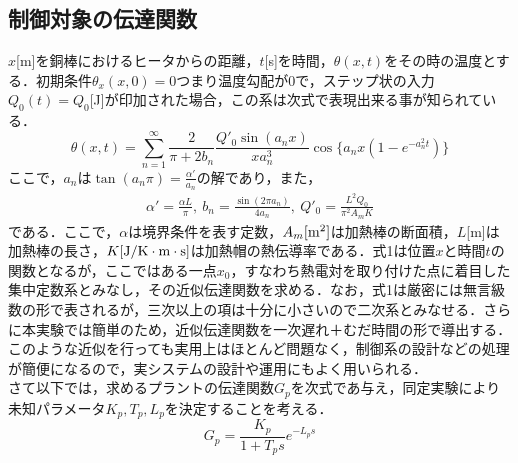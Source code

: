 \documentclass[11pt,a4paper]{jsarticle}
\begin{document}
  \subsection{制御対象の伝達関数}
  $x$[m]を銅棒におけるヒータからの距離，$t$[s]を時間，$\theta(x,t)$をその時の温度とする．初期条件$\theta_x(x,0) = 0$つまり温度勾配が$0$で，ステップ状の入力$Q_0(t) = Q_0$[J]が印加された場合，この系は次式で表現出来る事が知られている．
  \begin{equation}
   \theta(x,t) = \sum_{n = 1}^{\infty} 
    \frac{2}{\pi + 2b_n} 
    \frac{Q'_0 \sin(a_n x)}{x a_n^3} 
     \cos \{ a_n x(1-e^{-a_n^2 t}) \}
  \end{equation}
  ここで，$a_n$は$\tan(a_n \pi) = \frac{\alpha '}{a_n}$の解であり，また，
  \begin{eqnarray*}
   \alpha ' = \frac{\alpha L}{\pi}, \ b_n = \frac{\sin(2\pi a_n)}{4a_n}, \ Q'_0 = \frac{L^2 Q_0}{\pi^2 A_m K}
  \end{eqnarray*}
  である．ここで，$\alpha$は境界条件を表す定数，$A_m[{\rm m^2}]$は加熱棒の断面積，$L$[m]は加熱棒の長さ，$K[{\rm J/K \cdot m \cdot s}]$は加熱帽の熱伝導率である．式1は位置$x$と時間$t$の関数となるが，ここではある一点$x_0$，すなわち熱電対を取り付けた点に着目した集中定数系とみなし，その近似伝達関数を求める．なお，式1は厳密には無言級数の形で表されるが，三次以上の項は十分に小さいので二次系とみなせる．さらに本実験では簡単のため，近似伝達関数を一次遅れ＋むだ時間の形で導出する．このような近似を行っても実用上はほとんど問題なく，制御系の設計などの処理が簡便になるので，実システムの設計や運用にもよく用いられる．\\
  さて以下では，求めるプラントの伝達関数$G_p$を次式であ与え，同定実験により未知パラメータ$K_p,T_p,L_p$を決定することを考える．
  \begin{equation}
   G_p = \frac{K_p}{1+T_p s} e^{-L_p s}
  \end{equation}
\end{document}
